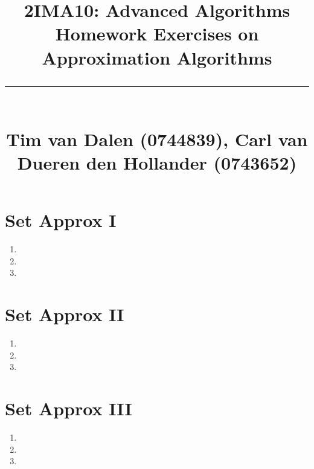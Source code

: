 \documentclass[a4paper,11pt]{article}
\title{
	\huge\raggedright 2IMA10: Advanced Algorithms \hfill\\{\Large Homework Exercises on Approximation Algorithms}\\ \vspace{-0.9\baselineskip}\rule{\linewidth}{1pt}\\
	\small\hfill Tim van Dalen (0744839), Carl van Dueren den Hollander (0743652)
	\normalsize
}
\begin{document}
	\maketitle

	\section*{Set Approx I}
		\begin{enumerate}
			\item 
			\item 
			\item 
		\end{enumerate}
	\section*{Set Approx II}
		\begin{enumerate}
			\item 
			\item 
			\item 
		\end{enumerate}
	\section*{Set Approx III}
		\begin{enumerate}
			\item 
			\item 
			\item 
		\end{enumerate}
\end{document}
